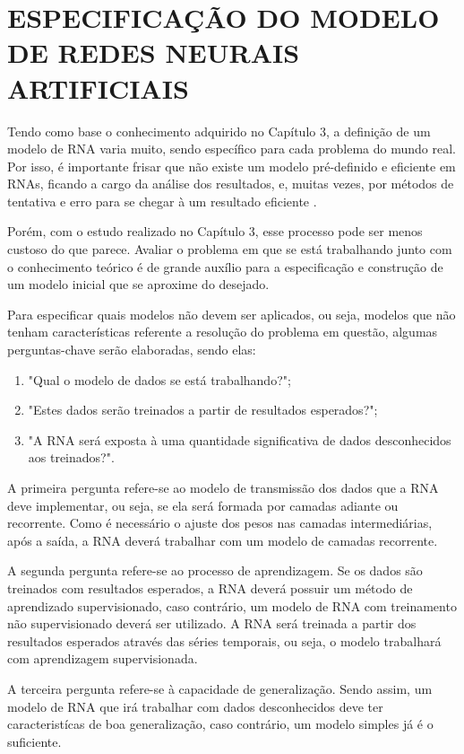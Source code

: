 \section{ESPECIFICAÇÃO DO MODELO DE REDES NEURAIS ARTIFICIAIS}\label{especifica-modelo}
Tendo como base o conhecimento adquirido no Capítulo 3, a definição de um modelo de RNA varia muito, sendo específico para cada problema do mundo real. Por isso, é importante frisar que não existe um modelo pré-definido e eficiente em RNAs, ficando a cargo da análise dos resultados, e, muitas vezes, por métodos de tentativa e erro para se chegar à um resultado eficiente \cite{haykin2000}.
 
Porém, com o estudo realizado no Capítulo 3, esse processo pode ser menos custoso do que parece. Avaliar o problema em que se está trabalhando junto com o conhecimento teórico é de grande auxílio para a especificação e construção de um modelo inicial que se aproxime do desejado.

Para especificar quais modelos não devem ser aplicados, ou seja, modelos que não tenham características referente a resolução do problema em questão, algumas perguntas-chave serão elaboradas, sendo elas:

\begin{enumerate}\label{enumerate-questions}
\item "Qual o modelo de dados se está trabalhando?";
\item "Estes dados serão treinados a partir de resultados esperados?";
\item "A RNA será exposta à uma quantidade significativa de dados desconhecidos aos treinados?".
\end{enumerate}

A primeira pergunta refere-se ao modelo de transmissão dos dados que a RNA deve implementar, ou seja, se ela será formada por camadas adiante ou recorrente. Como é necessário o ajuste dos pesos nas camadas intermediárias, após a saída, a RNA deverá trabalhar com um modelo de camadas recorrente.

A segunda pergunta refere-se ao processo de aprendizagem. Se os dados são treinados com resultados esperados, a RNA deverá possuir um método de aprendizado supervisionado, caso contrário, um modelo de RNA com treinamento não supervisionado deverá ser utilizado. A RNA será treinada a partir dos resultados esperados através das séries temporais, ou seja, o modelo trabalhará com aprendizagem supervisionada.

A terceira pergunta refere-se à capacidade de generalização. Sendo assim, um modelo de RNA que irá trabalhar com dados desconhecidos deve ter caracteristícas de boa generalização, caso contrário, um modelo simples já é o suficiente.


